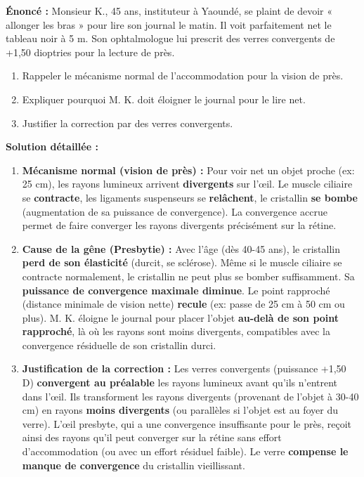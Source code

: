 \documentclass[11pt]{article}
\begin{document}
\begin{exoresolu}
\textbf{Énoncé :} Monsieur K., 45 ans, instituteur à Yaoundé, se plaint de devoir « allonger les bras » pour lire son journal le matin. Il voit parfaitement net le tableau noir à 5 m. Son ophtalmologue lui prescrit des verres convergents de +1,50 dioptries pour la lecture de près.
\begin{enumerate}
    \item Rappeler le mécanisme normal de l'accommodation pour la vision de près.
    \item Expliquer pourquoi M. K. doit éloigner le journal pour le lire net.
    \item Justifier la correction par des verres convergents.
\end{enumerate}
\tcblower
\textbf{Solution détaillée :}
\begin{enumerate}
    \item \textbf{Mécanisme normal (vision de près) :} Pour voir net un objet proche (ex: 25 cm), les rayons lumineux arrivent \textbf{divergents} sur l'œil. Le muscle ciliaire se \textbf{contracte}, les ligaments suspenseurs se \textbf{relâchent}, le cristallin \textbf{se bombe} (augmentation de sa puissance de convergence). La convergence accrue permet de faire converger les rayons divergents précisément sur la rétine.
    \item \textbf{Cause de la gêne (Presbytie) :} Avec l'âge (dès 40-45 ans), le cristallin \textbf{perd de son élasticité} (durcit, se sclérose). Même si le muscle ciliaire se contracte normalement, le cristallin ne peut plus se bomber suffisamment. Sa \textbf{puissance de convergence maximale diminue}. Le point rapproché (distance minimale de vision nette) \textbf{recule} (ex: passe de 25 cm à 50 cm ou plus). M. K. éloigne le journal pour placer l'objet \textbf{au-delà de son point rapproché}, là où les rayons sont moins divergents, compatibles avec la convergence résiduelle de son cristallin durci.
    \item \textbf{Justification de la correction :} Les verres convergents (puissance +1,50 D) \textbf{convergent au préalable} les rayons lumineux avant qu'ils n'entrent dans l'œil. Ils transforment les rayons divergents (provenant de l'objet à 30-40 cm) en rayons \textbf{moins divergents} (ou parallèles si l'objet est au foyer du verre). L'œil presbyte, qui a une convergence insuffisante pour le près, reçoit ainsi des rayons qu'il peut converger sur la rétine sans effort d'accommodation (ou avec un effort résiduel faible). Le verre \textbf{compense le manque de convergence} du cristallin vieillissant.
\end{enumerate}
\end{exoresolu}
\end{document}
